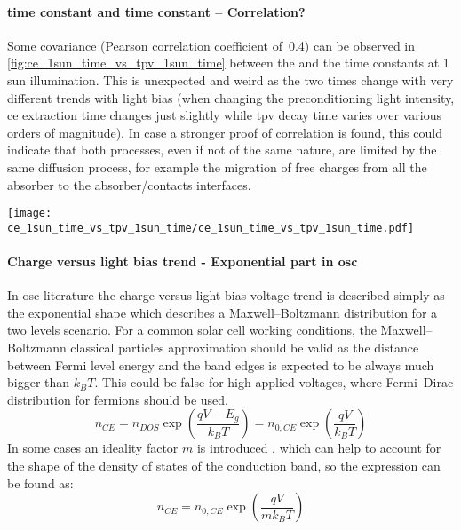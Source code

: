 \paragraph{ time constant and  time constant -- Correlation?} Some covariance (Pearson correlation coefficient of~0.4) can be observed in \cref{fig:ce_1sun_time_vs_tpv_1sun_time} between the  and the  time constants at 1 sun illumination. This is unexpected and weird as the two times change with very different trends with light bias (when changing the preconditioning light intensity, \gls{ce} extraction time changes just slightly while \gls{tpv} decay time varies over various orders of magnitude). In case a stronger proof of correlation is found, this could indicate that both processes, even if not of the same nature, are limited by the same diffusion process, for example the migration of free charges from all the absorber to the absorber/contacts interfaces.

\begin{SCfigure}%
	\centering
	\texttt{[image: ce\_1sun\_time\_vs\_tpv\_1sun\_time/ce\_1sun\_time\_vs\_tpv\_1sun\_time.pdf]}
	\label{fig:ce_1sun_time_vs_tpv_1sun_time}
\end{SCfigure}

\paragraph{Charge versus light bias trend - Exponential part in \gls{osc}}
In \gls{osc} literature the charge versus light bias voltage trend is described simply as the exponential shape which describes a Maxwell--Boltzmann distribution for a two levels scenario. For a common solar cell working conditions, the Maxwell--Boltzmann classical particles approximation should be valid as the distance between Fermi level energy and the band edges is expected to be always much bigger than $k_BT$. This could be false for high applied voltages, where Fermi--Dirac distribution for fermions should be used.
$$n_{CE} = n_{DOS} \exp\left(\frac{qV - E_g}{k_BT}\right) = n_{0,CE} \exp\left(\frac{qV}{k_BT}\right)$$
In some cases an ideality factor $m$ is introduced \cite{Kirchartz2012}, which can help to account for the shape of the density of states of the conduction band, so the expression can be found as:
$$n_{CE} = n_{0,CE} \exp\left(\frac{qV}{mk_BT}\right)$$


